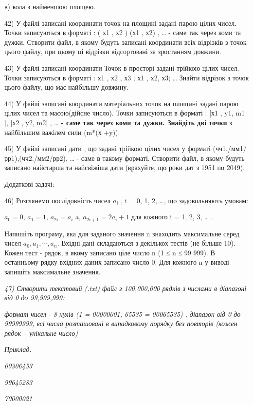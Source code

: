 \documentclass[]{article}
\begin{document}
в) кола з найменшою площею.

42) У файлі записані координати точок на площині задані парою цілих
чисел. Точки записуються в форматі : ( х1 , х2 ) (х1 , х2) , \ldots{} -
саме так через коми та дужки. Створити файл, в якому будуть записані
координати всіх відрізків з точок цього файлу, при цьому ці відрізки
відсортовані за зростанням довжини.

43) У файлі записані координати Точок в просторі задані трійкою цілих
чисел. Точки записуються в форматі : х1 , х2 , х3 ; х1 , х2, х3;
\ldots{} Знайти відрізок з точок цього файлу, що має найбільшу довжину.

44) У файлі записані координати матеріальних точок на площині задані
парою цілих чисел та масою(дійсне число). Точки записуються в форматі :
{[}х1 , y1, m1 {]}, {[}х2 , y2, m2{]} , \ldots{} \textbf{- саме так
через коми та дужки. Знайдіть дві точки} з найбільшим важілем сили (m*(х
+y)).

45) У файлі записані дати , що задані трійкою цілих чисел у форматі
(чч1./мм1/рр1),(чч2./мм2/рр2), \ldots{} - саме в такому форматі.
Створити файл, в якому будуть записано найстарша та найсвіжіша дати
(врахуйте, що роки дат з 1951 по 2049).

Додаткові задачі:

46) Розглянемо послідовність чисел \(a_{i}\) , i = 0, 1, 2, \ldots{}, що
задовольняють умовам:

\(a_{0} = 0\), \(a_{1} = 1\), \(a_{2i} = a_{i}\) a,
\(a_{2i + 1} = {2a}_{i} + 1\) для кожного i = 1, 2, 3, \ldots{} .

Напишіть програму, яка для заданого значення n знаходить максимальне
серед чисел \(a_{0},a_{1},\cdots,a_{n}\). Вхідні дані складаються з
декількох тестів (не більше 10). Кожен тест - рядок, в якому записано
ціле число n (1 ≤ n ≤ 99 999). В останньому рядку вхідних даних записано
число 0. Для кожного n у виводі запишіть максимальне значення.

\emph{47) Створити текстовий (.txt) файл з 100,000,000 рядків з числами
в діапазоні від 0 до 99,999,999:}

\emph{формат чисел - 8 нулів (1 = 00000001, 65535 = 00065535) , діапазон
від 0 до 99999999, всі числа розташовані в випадковому порядку без
повторів (кожен рядок -- унікальне число)}

\emph{Приклад.}

\emph{00306453 }

\emph{99645283 }

\emph{70000021 }
\end{document}
